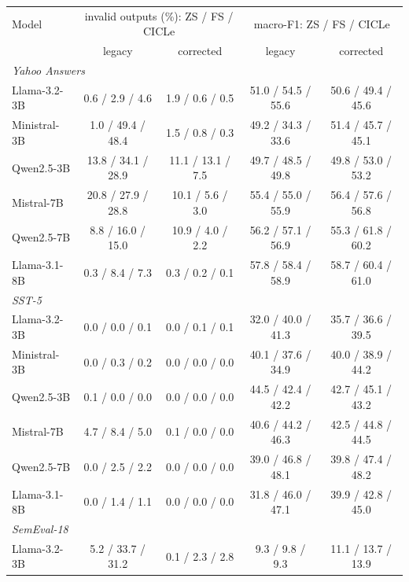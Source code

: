 \begin{tabular}{lcccc}
\toprule
Model & \multicolumn{2}{c}{invalid outputs (\%): ZS / FS / CICLe} & \multicolumn{2}{c}{macro-F1: ZS / FS / CICLe} \\
 & legacy & corrected & legacy & corrected \\
\midrule
\multicolumn{5}{l}{\emph{Yahoo Answers}} \\
Llama-3.2-3B & 0.6 / 2.9 / 4.6 & 1.9 / 0.6 / 0.5 & 51.0 / 54.5 / 55.6 & 50.6 / 49.4 / 45.6 \\
Ministral-3B & 1.0 / 49.4 / 48.4 & 1.5 / 0.8 / 0.3 & 49.2 / 34.3 / 33.6 & 51.4 / 45.7 / 45.1 \\
Qwen2.5-3B & 13.8 / 34.1 / 28.9 & 11.1 / 13.1 / 7.5 & 49.7 / 48.5 / 49.8 & 49.8 / 53.0 / 53.2 \\
Mistral-7B & 20.8 / 27.9 / 28.8 & 10.1 / 5.6 / 3.0 & 55.4 / 55.0 / 55.9 & 56.4 / 57.6 / 56.8 \\
Qwen2.5-7B & 8.8 / 16.0 / 15.0 & 10.9 / 4.0 / 2.2 & 56.2 / 57.1 / 56.9 & 55.3 / 61.8 / 60.2 \\
Llama-3.1-8B & 0.3 / 8.4 / 7.3 & 0.3 / 0.2 / 0.1 & 57.8 / 58.4 / 58.9 & 58.7 / 60.4 / 61.0 \\
\midrule
\multicolumn{5}{l}{\emph{SST-5}} \\
Llama-3.2-3B & 0.0 / 0.0 / 0.1 & 0.0 / 0.1 / 0.1 & 32.0 / 40.0 / 41.3 & 35.7 / 36.6 / 39.5 \\
Ministral-3B & 0.0 / 0.3 / 0.2 & 0.0 / 0.0 / 0.0 & 40.1 / 37.6 / 34.9 & 40.0 / 38.9 / 44.2 \\
Qwen2.5-3B & 0.1 / 0.0 / 0.0 & 0.0 / 0.0 / 0.0 & 44.5 / 42.4 / 42.2 & 42.7 / 45.1 / 43.2 \\
Mistral-7B & 4.7 / 8.4 / 5.0 & 0.1 / 0.0 / 0.0 & 40.6 / 44.2 / 46.3 & 42.5 / 44.8 / 44.5 \\
Qwen2.5-7B & 0.0 / 2.5 / 2.2 & 0.0 / 0.0 / 0.0 & 39.0 / 46.8 / 48.1 & 39.8 / 47.4 / 48.2 \\
Llama-3.1-8B & 0.0 / 1.4 / 1.1 & 0.0 / 0.0 / 0.0 & 31.8 / 46.0 / 47.1 & 39.9 / 42.8 / 45.0 \\
\midrule
\multicolumn{5}{l}{\emph{SemEval-18}} \\
Llama-3.2-3B & 5.2 / 33.7 / 31.2 & 0.1 / 2.3 / 2.8 & 9.3 / 9.8 / 9.3 & 11.1 / 13.7 / 13.9 \\

\end{tabular}
